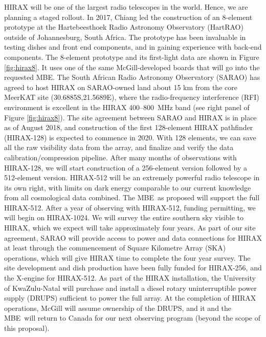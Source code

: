 \documentclass[11pt]{article}
\newcommand{\mbe}{{\rm MBE}}
\begin{document}
HIRAX will be one of the largest radio telescopes in the world.
Hence, we are planning a staged rollout.  In 2017, Chiang led the
construction of an 8-element prototype at the Hartebeesthoek Radio
Astronomy Observatory (HartRAO) outside of Johannesburg, South Africa.
The prototype has been invaluable in testing dishes and front end
components, and in gaining experience with back-end components.  The
8-element prototype and its first-light data are shown in Figure
\ref{fig:hirax8}.  It uses one of the same McGill-developed boards
that will go into the requested \mbe.  The South African Radio
Astronomy Observatory (SARAO) has agreed to host HIRAX on SARAO-owned
land about 15 km from the core MeerKAT site (30.6885S,21.5689E), where
the radio-frequency interference (RFI) environment is excellent in the
HIRAX 400--800~MHz band (see right panel of Figure
\ref{fig:hirax8}). The site agreement between SARAO and HIRAX is in
place as of August 2018, and construction of the first 128-element
HIRAX pathfinder (HIRAX-128) is expected to commence in 2020.  With
128 elements, we can save all the raw visibility data from the array,
and finalize and verify the data calibration/compression
pipeline. After many months of observations with HIRAX-128, we will
start construction of a 256-element version followed by a 512-element
version.  HIRAX-512 will be an extremely powerful radio telescope in
its own right, with limits on dark energy comparable to our current
knowledge from all cosmological data combined.  The \mbe\ as proposed
will support the full HIRAX-512. After a year of observing with
HIRAX-512, funding permitting, we will begin on HIRAX-1024.  We will
survey the entire southern sky visible to HIRAX, which we expect will
take approximately four years.  As part of our site agreement, SARAO
will provide access to power and data connections for HIRAX at least
through the commencement of Square Kilometre Array (SKA) operations,
which will give HIRAX time to complete the four year survey.  The site
development and dish production have been fully funded for HIRAX-256,
and the X-engine for HIRAX-512.  As part of the HIRAX installation,
the University of KwaZulu-Natal will purchase and install a diesel
rotary uninterruptible power supply (DRUPS) sufficient to power the
full array.  At the completion of HIRAX operations, McGill will assume
ownership of the DRUPS, and it and the \mbe\ will return to Canada for
our next observing program (beyond the scope of this proposal).

\end{document}
